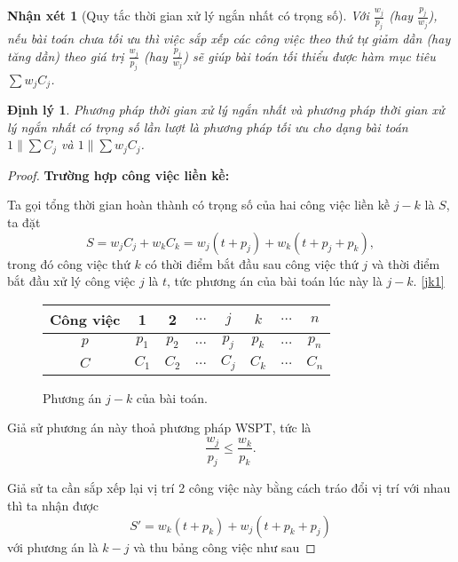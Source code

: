 \documentclass[12pt,a4paper]{report}
\newtheorem{dl}{Định lý}
\newtheorem{nx}{Nhận xét}
\begin{document}
\begin{nx}[Quy tắc thời gian xử lý ngắn nhất có trọng số]
Với $\frac{w_j}{p_j}$ (hay $\frac{p_j}{w_j}$), nếu bài toán chưa tối ưu thì việc sắp xếp các công việc theo thứ tự giảm dần (hay tăng dần) theo giá trị $\frac{w_j}{p_j}$ (hay $\frac{p_j}{w_j}$) sẽ giúp bài toán tối thiểu được hàm mục tiêu $\sum w_j C_j$.
\end{nx}

\begin{dl}
	Phương pháp thời gian xử lý ngắn nhất và phương pháp thời gian xử lý ngắn nhất có trọng số lần lượt là phương pháp tối ưu cho dạng bài toán $1 \| \sum C_j$ và $1 \| \sum w_j C_j$.
\end{dl}

\begin{proof}

\phantom{text}

\textbf{Trường hợp công việc liền kề:}

	Ta gọi tổng thời gian hoàn thành có trọng số của hai công việc liền kề $j-k$ là $S$, ta đặt
	\begin{equation} \label{S}
		S = w_j C_j + w_k C_k = w_j(t+p_j) + w_k(t+p_j+p_k),
	\end{equation}
	trong đó công việc thứ $k$ có thời điểm bắt đầu sau công việc thứ $j$ và thời điểm bắt đầu xử lý công việc $j$ là $t$, tức phương án của bài toán lúc này là $j - k$. \eqref{jk1}
	
	\begin{figure}[h!]
		\centering
		 \begin{tabular}{|c | c c c c c c c |} 
		 \hline
		 Công việc & 1 & 2 & $\ldots$ & $j$ & $k$ & $\ldots$ & $n$ \\
		 \hline\hline
		 $p$ & $p_1$ & $p_2$ & $\ldots$ & $p_j$ & $p_k$ & $\ldots$ & $p_n$ \\
		 $C$ & $C_1$ & $C_2$ & $\ldots$ & $C_j$ & $C_k$ & $\ldots$ & $C_n$ \\
		 \hline
		 \end{tabular}
	\caption{\label{jk1}Phương án $j - k$ của bài toán.}
	\end{figure}
	
	Giả sử phương án này thoả phương pháp WSPT, tức là
	\begin{equation}
	\frac{w_j}{p_j} \leq \frac{w_k}{p_k}.
	\end{equation}
	
	Giả sử ta cần sắp xếp lại vị trí 2 công việc này bằng cách tráo đổi vị trí với nhau thì ta nhận được
	\begin{equation} \label{S'}
		S' = w_k(t+p_k) + w_j(t+p_k+p_j)
	\end{equation}
	với phương án là $k-j$ và thu bảng công việc như sau
	

\end{proof}
\end{document}
